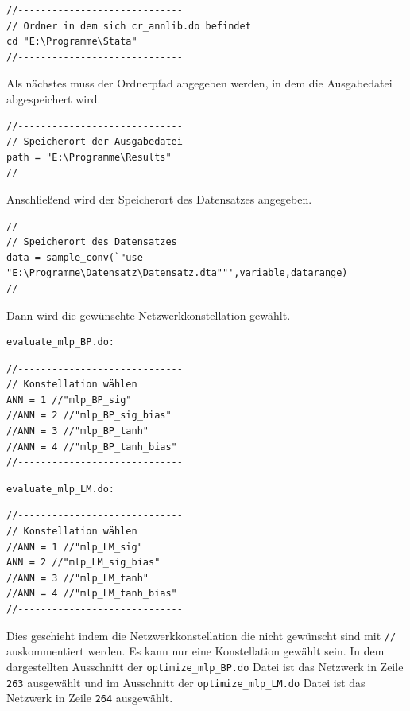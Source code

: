 {
\begin{lstlisting}[firstnumber=3]
//-----------------------------
// Ordner in dem sich cr_annlib.do befindet
cd "E:\Programme\Stata"
//-----------------------------
\end{lstlisting}
}

Als nächstes muss der Ordnerpfad angegeben werden, in dem die Ausgabedatei abgespeichert wird. 

{
\begin{lstlisting}[firstnumber=272]
//-----------------------------
// Speicherort der Ausgabedatei
path = "E:\Programme\Results"
//-----------------------------
\end{lstlisting}
}

Anschließend wird der Speicherort des Datensatzes angegeben.

{
\begin{lstlisting}[firstnumber=304]
//-----------------------------
// Speicherort des Datensatzes
data = sample_conv(`"use "E:\Programme\Datensatz\Datensatz.dta""',variable,datarange)
//-----------------------------
\end{lstlisting}
}

Dann wird die gewünschte Netzwerkkonstellation gewählt.
\begin{Verbatim}
evaluate_mlp_BP.do:
\end{Verbatim}
{
\begin{lstlisting}[firstnumber=261]
//-----------------------------
// Konstellation wählen
ANN = 1 //"mlp_BP_sig"
//ANN = 2 //"mlp_BP_sig_bias"
//ANN = 3 //"mlp_BP_tanh"
//ANN = 4 //"mlp_BP_tanh_bias"
//-----------------------------
\end{lstlisting}
}

\newpage

\begin{Verbatim}
evaluate_mlp_LM.do:
\end{Verbatim}
{
\begin{lstlisting}[firstnumber=261]
//-----------------------------
// Konstellation wählen
//ANN = 1 //"mlp_LM_sig"
ANN = 2 //"mlp_LM_sig_bias"
//ANN = 3 //"mlp_LM_tanh"
//ANN = 4 //"mlp_LM_tanh_bias"
//-----------------------------
\end{lstlisting}
}

Dies geschieht indem die Netzwerkkonstellation die nicht gewünscht sind mit \verb|//| auskommentiert werden. Es kann nur eine Konstellation gewählt sein. In dem dargestellten Ausschnitt der \verb|optimize_mlp_BP.do| Datei ist das Netzwerk in Zeile \verb|263| ausgewählt und im Ausschnitt der \verb|optimize_mlp_LM.do| Datei ist das Netzwerk in Zeile \verb|264| ausgewählt.

